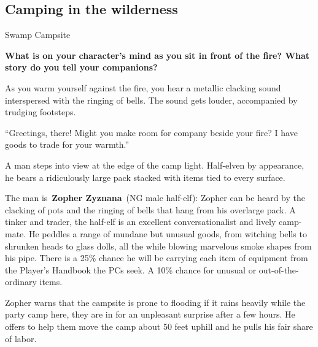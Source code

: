 \documentclass[10pt,twocolumn]{article}
\let\oldtextbf\textbf
\renewcommand{\textbf}[1]{\oldtextbf{{#1}}}
\renewenvironment{quote}
  {%
    \begingroup
      \setlength{\parindent}{1em}%
      \setlength{\parskip}{0pt}%
      \begin{tcolorbox}[myquote,
        before upper={%
          \let\textbf\oldtextbf
          \setlength{\parindent}{1.5em}%
          \setlength{\parskip}{0pt}%
          \noindent              %
        }%
      ]%
  }
  {%
      \end{tcolorbox}%
    \endgroup
  }
\begin{document}
\subsection{Camping in the wilderness}\label{camping-in-the-wilderness}

\begin{tcolorbox}[
  colback={imagecolor},
  coltext=black,
  colframe=black,
  boxrule=1pt,
  arc=6pt,
  left=4pt,
  right=4pt,
  top=2pt,
  bottom=2pt,
  boxsep=4pt,
  before skip=10pt,
  after skip=10pt,
  fontupper={\blockquoteFont\small\linespread{0.9}\selectfont\color{black}}
]

\faPhotoVideo\hspace{0.8em}\begin{minipage}[t]{\dimexpr\linewidth-1.8em\hangindent=1.8em\hangafter=0}Swamp
Campsite

\end{minipage}\end{tcolorbox}

\textbf{What is on your character's mind as you sit in front of the
fire? What story do you tell your companions?}

\begin{quote}
As you warm yourself against the fire, you hear a metallic clacking
sound interspersed with the ringing of bells. The sound gets louder,
accompanied by trudging footsteps.

``Greetings, there! Might you make room for company beside your fire? I
have goods to trade for your warmth.''

A man steps into view at the edge of the camp light. Half-elven by
appearance, he bears a ridiculously large pack stacked with items tied
to every surface.
\end{quote}

The man is~\textbf{Zopher Zyznana}~(NG male half-elf): Zopher can be
heard by the clacking of pots and the ringing of bells that hang from
his overlarge pack. A tinker and trader, the half-elf is an excellent
conversationalist and lively camp-mate. He peddles a range of mundane
but unusual goods, from witching bells to shrunken heads to glass dolls,
all the while blowing marvelous smoke shapes from his pipe. There is a
25\% chance he will be carrying each item of equipment from the Player's
Handbook the PCs seek. A 10\% chance for unusual or out-of-the-ordinary
items.

Zopher warns that the campsite is prone to flooding if it rains heavily
while the party camp here, they are in for an unpleasant surprise after
a few hours. He offers to help them move the camp about 50 feet uphill
and he pulls his fair share of labor.
\end{document}
